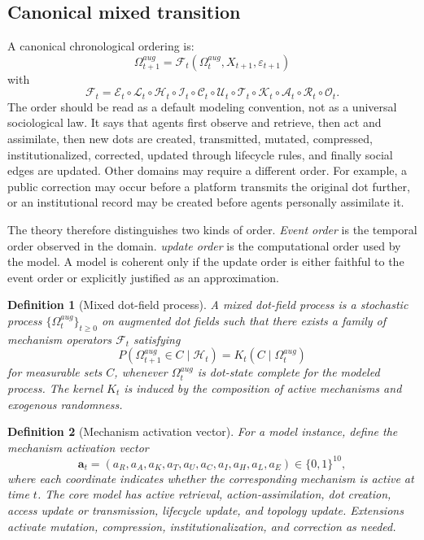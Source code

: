 \documentclass[11pt]{article}
\newtheorem{definition}{Definition}
\theoremstyle{remark}
\begin{document}
\subsection{Canonical mixed transition}\label{canonical-mixed-transition}

A canonical chronological ordering is:
\[
\Omega_{t+1}^{aug}=\mathscr F_t(\Omega_t^{aug},X_{t+1},\varepsilon_{t+1})
\]
with
\[
\mathscr F_t
=
\mathscr E_t\circ
\mathscr L_t\circ
\mathscr H_t\circ
\mathscr I_t\circ
\mathscr C_t\circ
\mathscr U_t\circ
\mathscr T_t\circ
\mathscr K_t\circ
\mathscr A_t\circ
\mathscr R_t\circ
\mathscr O_t.
\]
The order should be read as a default modeling convention, not as a universal sociological law. It says that agents first observe and retrieve, then act and assimilate, then new dots are created, transmitted, mutated, compressed, institutionalized, corrected, updated through lifecycle rules, and finally social edges are updated. Other domains may require a different order. For example, a public correction may occur before a platform transmits the original dot further, or an institutional record may be created before agents personally assimilate it.

The theory therefore distinguishes two kinds of order. \emph{Event order} is the temporal order observed in the domain. \emph{update order} is the computational order used by the model. A model is coherent only if the update order is either faithful to the event order or explicitly justified as an approximation.

\begin{definition}[Mixed dot-field process]
A mixed dot-field process is a stochastic process \(\{\Omega_t^{aug}\}_{t\geq 0}\) on augmented dot fields such that there exists a family of mechanism operators \(\mathscr F_t\) satisfying
\[
P(\Omega_{t+1}^{aug}\in C\mid \mathcal H_t)=K_t(C\mid \Omega_t^{aug})
\]
for measurable sets \(C\), whenever \(\Omega_t^{aug}\) is dot-state complete for the modeled process. The kernel \(K_t\) is induced by the composition of active mechanisms and exogenous randomness.
\end{definition}

\begin{definition}[Mechanism activation vector]
For a model instance, define the mechanism activation vector
\[
\mathbf a_t=(a_R,a_A,a_K,a_T,a_U,a_C,a_I,a_H,a_L,a_E)\in\{0,1\}^{10},
\]
where each coordinate indicates whether the corresponding mechanism is active at time \(t\). The core model has active retrieval, action-assimilation, dot creation, access update or transmission, lifecycle update, and topology update. Extensions activate mutation, compression, institutionalization, and correction as needed.
\end{definition}
\end{document}
